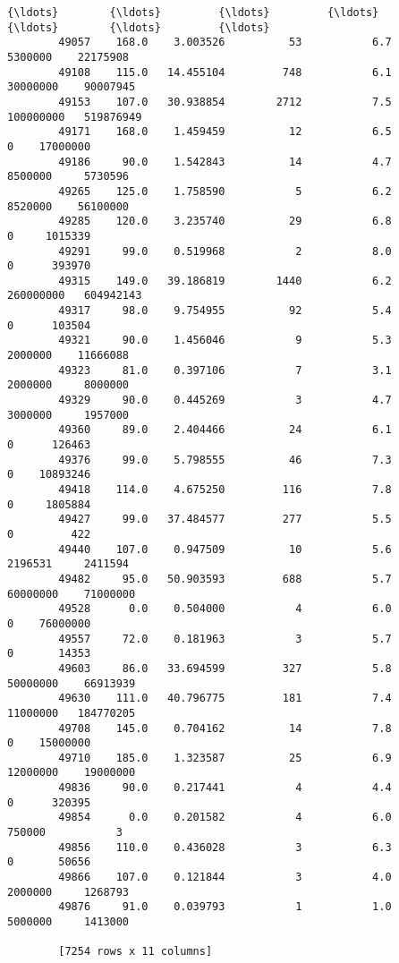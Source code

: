 \documentclass[11pt]{article}
\begin{document}
\begin{Verbatim}[commandchars=\\\{\}]
        {\ldots}        {\ldots}         {\ldots}         {\ldots}           {\ldots}        {\ldots}         {\ldots}  
        49057    168.0    3.003526          53           6.7    5300000    22175908  
        49108    115.0   14.455104         748           6.1   30000000    90007945  
        49153    107.0   30.938854        2712           7.5  100000000   519876949  
        49171    168.0    1.459459          12           6.5          0    17000000  
        49186     90.0    1.542843          14           4.7    8500000     5730596  
        49265    125.0    1.758590           5           6.2    8520000    56100000  
        49285    120.0    3.235740          29           6.8          0     1015339  
        49291     99.0    0.519968           2           8.0          0      393970  
        49315    149.0   39.186819        1440           6.2  260000000   604942143  
        49317     98.0    9.754955          92           5.4          0      103504  
        49321     90.0    1.456046           9           5.3    2000000    11666088  
        49323     81.0    0.397106           7           3.1    2000000     8000000  
        49329     90.0    0.445269           3           4.7    3000000     1957000  
        49360     89.0    2.404466          24           6.1          0      126463  
        49376     99.0    5.798555          46           7.3          0    10893246  
        49418    114.0    4.675250         116           7.8          0     1805884  
        49427     99.0   37.484577         277           5.5          0         422  
        49440    107.0    0.947509          10           5.6    2196531     2411594  
        49482     95.0   50.903593         688           5.7   60000000    71000000  
        49528      0.0    0.504000           4           6.0          0    76000000  
        49557     72.0    0.181963           3           5.7          0       14353  
        49603     86.0   33.694599         327           5.8   50000000    66913939  
        49630    111.0   40.796775         181           7.4   11000000   184770205  
        49708    145.0    0.704162          14           7.8          0    15000000  
        49710    185.0    1.323587          25           6.9   12000000    19000000  
        49836     90.0    0.217441           4           4.4          0      320395  
        49854      0.0    0.201582           4           6.0     750000           3  
        49856    110.0    0.436028           3           6.3          0       50656  
        49866    107.0    0.121844           3           4.0    2000000     1268793  
        49876     91.0    0.039793           1           1.0    5000000     1413000  
        
        [7254 rows x 11 columns]
\end{Verbatim}
            
\end{document}
